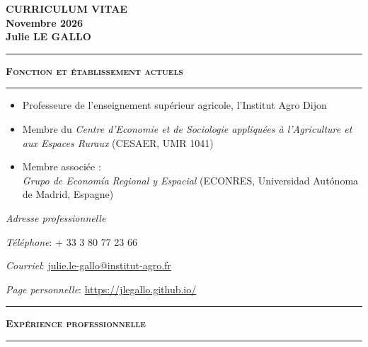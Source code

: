 \documentclass[a4paper,12pt]{article}
\newcommand{\titre}[1]{%
	\bigskip
	\noindent \rule[2mm]{\textwidth}{0.5pt}
	\textbf{\textsc{\large #1}} \\
	\noindent \rule[1mm]{\textwidth}{0.5pt}
	}
\begin{document}

\begin{center}
	\textbf{{\Large CURRICULUM VITAE}} \smallskip
	\\ \textbf{{\large Novembre 2026}} 	\bigskip \bigskip
	\\ \textbf{{\Large Julie LE GALLO}}
\end{center}

\bigskip


\titre{Fonction et établissement actuels}

\begin{itemize}[leftmargin=*]
	\item Professeure de l'enseignement supérieur agricole, l'Institut Agro Dijon
	\item Membre du \textit{Centre d'Economie et de Sociologie appliquées à l'Agriculture et aux Espaces Ruraux} (CESAER, UMR 1041)
	\item Membre associée : \\
	 \textit{Grupo de Economía Regional y Espacial} (ECONRES, Universidad Autónoma de Madrid, Espagne)
\end{itemize} 

\bigskip
 
\textit{Adresse professionnelle}
\par {}
\par {}
\par {}
\par {} \smallskip
\par \textit{Téléphone}: + 33 3 80 77 23 66
\par \textit{Courriel}: \url{julie.le-gallo@institut-agro.fr} 
\par \textit{Page personnelle}: \url{https://jlegallo.github.io/} \\


\titre{Expérience professionnelle}


\newlength{\annee}
\settowidth{\annee}{2003 - 2006}

\end{document}
